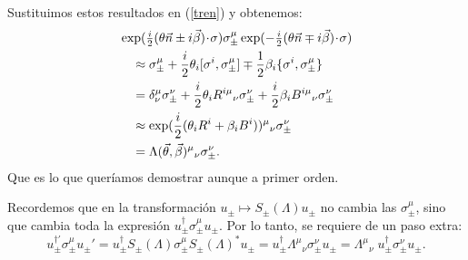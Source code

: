 \par Sustituimos estos resultados en (\ref{tren}) y obtenemos:
\begin{equation}\begin{split}
&\exp(\tfrac i2(\theta \vec n\pm i\vec\beta)\!\cdot\!\sigma)
\sigma_\pm^\mu
\exp(-\tfrac i2(\theta \vec n\mp i\vec\beta)\!\cdot\!\sigma)\\
&\quad\approx
\sigma_\pm^\mu
+\frac i2\theta_i[\sigma^i,\sigma_\pm^\mu]
\mp\frac12\beta_i\{\sigma^i,\sigma_\pm^\mu\}\\
&\quad=
\delta^\mu_\nu\sigma_\pm^\nu
+\frac i2\theta_iR^{i\mu}{}_\nu\sigma_\pm^\nu
+\frac i2\beta_iB^{i\mu}{}_\nu\sigma_\pm^\nu\\
&\quad\approx \exp(\frac i2(\theta_iR^i+\beta_iB^i))^\mu{}_\nu\sigma_\pm^\nu\\
&\quad=\Lambda(\vec\theta,\vec\beta)^\mu{}_\nu\sigma_\pm^\nu.
\end{split}\end{equation}
Que es lo que queríamos demostrar aunque a primer orden. \par Recordemos que en la transformación $u_\pm\mapsto S_\pm(\Lambda)u_\pm$ no cambia las $\sigma_\pm^\mu$, sino que cambia toda la expresión $u_\pm^\dagger\sigma_\pm^\mu u_\pm$. Por lo tanto, se requiere de un paso extra:
\begin{equation}
u_\pm^{\dagger\prime}\sigma_\pm^\mu u_\pm'
=
u_\pm^\dagger S_\pm(\Lambda)\sigma_\pm^\mu  S_\pm(\Lambda)^*u_\pm
=
u_\pm^\dagger\Lambda^\mu{}_\nu\sigma_\pm^\nu u_\pm
=
\Lambda^\mu{}_\nu\;u_\pm^\dagger\sigma_\pm^\nu u_\pm.
\end{equation}

